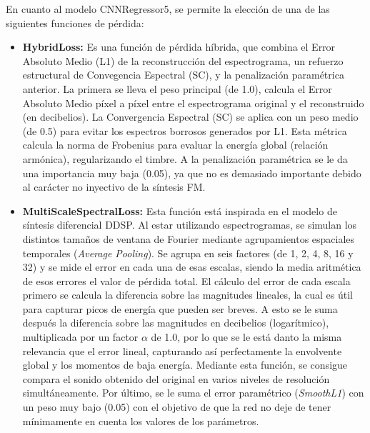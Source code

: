 \documentclass[12pt, a4paper]{article}
\begin{document}
\begin{itemize}
        En cuanto al modelo CNNRegressor5, se permite la elección de una de las siguientes funciones de pérdida:
    \begin{itemize}
        \item \textbf{HybridLoss: } %
        Es una función de pérdida híbrida, que combina el Error Absoluto Medio (L1) de la reconstrucción del 
        espectrograma, un refuerzo estructural de Convegencia Espectral (SC), y la penalización paramétrica anterior.
        La primera se lleva el peso principal (de 1.0), calcula el Error Absoluto Medio píxel a píxel entre el espectrograma original y el reconstruido (en decibelios).
        La Convergencia Espectral (SC) se aplica con un peso medio (de 0.5) para evitar los espectros borrosos generados por L1. Esta métrica calcula la norma de Frobenius 
        para evaluar la energía global (relación armónica), regularizando el timbre. A la penalización paramétrica se le da una importancia muy baja (0.05), ya que no es demasiado importante
        debido al carácter no inyectivo de la síntesis FM.
          
        \item \textbf{MultiScaleSpectralLoss: } Esta función está inspirada en el modelo de síntesis diferencial DDSP. Al estar utilizando 
        espectrogramas, se simulan los distintos tamaños de ventana de Fourier mediante agrupamientos espaciales temporales (\textit{Average Pooling}).
        Se agrupa en seis factores (de 1, 2, 4, 8, 16 y 32) y se mide el error en cada una de esas escalas, siendo la media aritmética de esos errores
        el valor de pérdida total. El cálculo del error de cada escala primero se calcula la diferencia sobre las magnitudes
        lineales, la cual es útil para capturar picos de energía que pueden ser breves. A esto se le suma después la diferencia sobre las magnitudes en decibelios (logarítmico),
        multiplicada por un factor $\alpha$ de 1.0, por lo que se le está danto la misma relevancia que el error lineal, capturando así perfectamente
        la envolvente global y los momentos de baja energía. Mediante esta función, se consigue compara el sonido obtenido del original
        en varios niveles de resolución simultáneamente. Por último, se le suma el error paramétrico (\textit{SmoothL1}) con un peso muy bajo (0.05) con el objetivo
        de que la red no deje de tener mínimamente en cuenta los valores de los parámetros.   
    \end{itemize}
\end{itemize}
\end{document}

